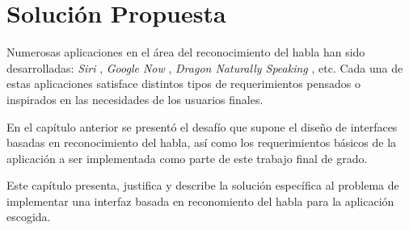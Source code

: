 \chapter{Soluci\'on Propuesta}
\label{sec:solucion}

Numerosas aplicaciones en el \'area del reconocimiento del habla han sido desarrolladas: \emph{Siri} \cite{AppleSiri}, \emph{Google Now} \cite{GoogleNow}, 
\emph{Dragon Naturally Speaking} \cite{DragonNaturallySpeaking}, etc. Cada una de estas
aplicaciones satisface distintos tipos de requerimientos pensados o inspirados en las necesidades de los usuarios finales. 

En el cap\'itulo anterior se presentó el desafío que supone el diseño de interfaces basadas 
en reconocimiento del habla, así como los requerimientos básicos de la aplicación a ser implementada como 
parte de este trabajo final de grado.

Este cap\'itulo presenta, justifica y describe la soluci\'on espec\'ifica al problema de implementar una interfaz
basada en reconomiento del habla para la aplicaci\'on escogida.




